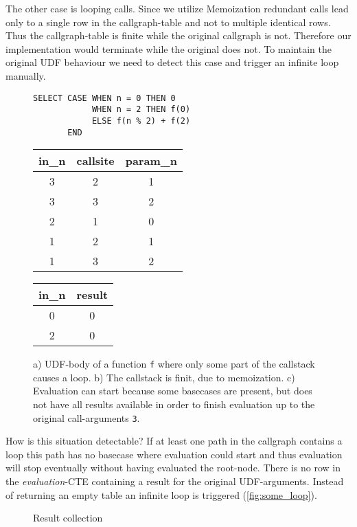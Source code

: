The other case is looping calls. Since we utilize Memoization redundant calls lead only to a single row in the callgraph-table and not to multiple identical rows. Thus the callgraph-table is finite while the original callgraph is not. Therefore our implementation would terminate while the original does not. To maintain the original UDF behaviour we need to detect this case and trigger an infinite loop manually.

\begin{figure}[h!]\small
    \begin{minipage}[b]{.45\linewidth}
    \centering
    \begin{verbatim}
SELECT CASE WHEN n = 0 THEN 0
            WHEN n = 2 THEN f(0)
            ELSE f(n % 2) + f(2)
       END
    \end{verbatim}
    \subcaption{}\label{fig:some_loop_udf}
    \end{minipage}%
    \begin{minipage}[b]{.3\linewidth}
    \centering
    \begin{tabular}{c|c|c}
in\_n & callsite & param\_n \\\hline
3 & 2 & 1 \\
3 & 3 & 2 \\
2 & 1 & 0 \\
1 & 2 & 1 \\
1 & 3 & 2
    \end{tabular}
    \subcaption{}\label{fig:some_loop_callstack}
    \end{minipage}
    \begin{minipage}[b]{.2\linewidth}
    \centering
    \begin{tabular}{c|c}
in\_n & result \\\hline
0 & 0 \\\hline
2 & 0 \\
    \end{tabular}
    \subcaption{}\label{fig:some_loop_evaluation}
    \end{minipage}
    \caption{a) UDF-body of a function \texttt{f} where only some part of the callstack causes a loop. b) The callstack is finit, due to memoization. c) Evaluation can start because some basecases are present, but does not have all results available in order to finish evaluation up to the original call-arguments \texttt{3}.}\label{fig:some_loop}
\end{figure}

How is this situation detectable? If at least one path in the callgraph contains a loop this path has no basecase where evaluation could start and thus evaluation will stop eventually without having evaluated the root-node. There is no row in the \textit{evaluation}-CTE containing a result for the original UDF-arguments. Instead of returning an empty table an infinite loop is triggered (\autoref{fig:some_loop}).

\begin{figure}[h!]
    \centering
    \caption{Result collection}
    \label{macro:result_collection}
    \vspace*{-3cm}
\end{figure}